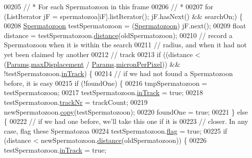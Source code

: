 \begin{DoxyCode}
00205             \textcolor{comment}{// * For each Spermatozoon in this frame}
00206             \textcolor{comment}{// *}
00207             \textcolor{keywordflow}{for} (ListIterator jF = spermatozoa[iF].listIterator(); jF.hasNext() && searchOn;) \{
00208               \hyperlink{classdata_1_1_spermatozoon}{Spermatozoon} testSpermatozoon = (\hyperlink{classdata_1_1_spermatozoon}{Spermatozoon}) jF.next();
00209               \textcolor{keywordtype}{float} distance = testSpermatozoon.\hyperlink{classdata_1_1_spermatozoon_aaef7a8e7602a08c82ea5fcbb777883e0}{distance}(oldSpermatozoon);
00210               \textcolor{comment}{// record a Spermatozoon when it is within the search}
00211               \textcolor{comment}{// radius, and when it had not yet been claimed by another}
00212               \textcolor{comment}{// track}
00213               \textcolor{keywordflow}{if} ((distance < (\hyperlink{classdata_1_1_params}{Params}.\hyperlink{classdata_1_1_params_ab28f784a26ca9d2ce7d7a785b158aa61}{maxDisplacement} / 
      \hyperlink{classdata_1_1_params}{Params}.\hyperlink{classdata_1_1_params_a19331ee97ef3c422984fc7dff976549e}{micronPerPixel})) && !testSpermatozoon.\hyperlink{classdata_1_1_spermatozoon_a204be1963f7e7f07114c1d42360376be}{inTrack}) \{
00214                 \textcolor{comment}{// if we had not found a Spermatozoon before, it is easy}
00215                 \textcolor{keywordflow}{if} (!foundOne) \{
00216                   tmpSpermatozoon = testSpermatozoon;
00217                   testSpermatozoon.\hyperlink{classdata_1_1_spermatozoon_a204be1963f7e7f07114c1d42360376be}{inTrack} = \textcolor{keyword}{true};
00218                   testSpermatozoon.\hyperlink{classdata_1_1_spermatozoon_aee0b3af79335b49fe9d9b025cfcde703}{trackNr} = trackCount;
00219                   newSpermatozoon.\hyperlink{classdata_1_1_spermatozoon_ac4622d389badba1a387ec1e139d35c8e}{copy}(testSpermatozoon);
00220                   foundOne = \textcolor{keyword}{true};
00221                 \} \textcolor{keywordflow}{else} \{
00222                   \textcolor{comment}{// if we had one before, we'll take this one if it is}
00223                   \textcolor{comment}{// closer. In any case, flag these Spermatozoa}
00224                   testSpermatozoon.\hyperlink{classdata_1_1_spermatozoon_ab46c49fb62e0ee61b3865f1e9153fdaa}{flag} = \textcolor{keyword}{true};
00225                   \textcolor{keywordflow}{if} (distance < newSpermatozoon.\hyperlink{classdata_1_1_spermatozoon_aaef7a8e7602a08c82ea5fcbb777883e0}{distance}(oldSpermatozoon)) \{
00226                     testSpermatozoon.\hyperlink{classdata_1_1_spermatozoon_a204be1963f7e7f07114c1d42360376be}{inTrack} = \textcolor{keyword}{true};

\end{DoxyCode}
